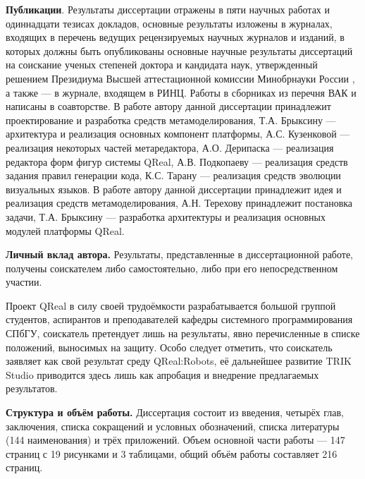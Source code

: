 \textbf{Публикации}. Результаты диссертации отражены в пяти научных работах и одиннадцати тезисах докладов, 
основные результаты изложены в журналах, входящих в перечень ведущих рецензируемых научных 
журналов и изданий, в которых должны быть опубликованы основные научные результаты диссертаций 
на соискание ученых степеней доктора и кандидата наук, утвержденный решением Президиума 
Высшей аттестационной комиссии Минобрнауки России ,
а также \cite{terekhov2009architecture, osechkina2010gestures} --- в журнале, входящем в РИНЦ. 
Работы в сборниках из перечня ВАК  и 
написаны в соавторстве. В работе  автору данной диссертации 
принадлежит проектирование и разработка средств метамоделирования, Т.А. Брыксину --- архитектура и реализация основных
компонент платформы, А.С. Кузенковой --- реализация некоторых частей метаредактора, А.О. Дерипаска
--- реализация редактора форм фигур системы QReal, А.В. Подкопаеву --- реализация средств задания правил генерации кода,
К.С. Тарану --- реализация средств эволюции визуальных языков. В работе 
автору данной диссертации принадлежит идея и реализация средств метамоделирования, А.Н. Терехову 
принадлежит постановка задачи, Т.А. Брыксину --- разработка архитектуры и реализация основных модулей платформы QReal.

\textbf{Личный вклад автора.} Результаты, представленные в диссертационной работе, получены 
соискателем либо самостоятельно, либо при его непосредственном участии.

Проект QReal в силу своей трудоёмкости разрабатывается большой группой студентов, аспирантов
и преподавателей кафедры системного программирования СПбГУ, соискатель претендует лишь на
результаты, явно перечисленные в списке положений, выносимых на защиту. Особо следует отметить,
что соискатель заявляет как свой результат среду QReal:Robots, её дальнейшее развитие 
TRIK Studio приводится здесь лишь как апробация и внедрение предлагаемых результатов.

\textbf{Структура и объём работы.} Диссертация состоит из введения, четырёх глав, заключения, 
списка сокращений и условных обозначений, списка литературы (144 наименования) и трёх 
приложений. Объем основной части работы --- 147 страниц с 19 рисунками и 3 таблицами, 
общий объём работы составляет 216 страниц.


